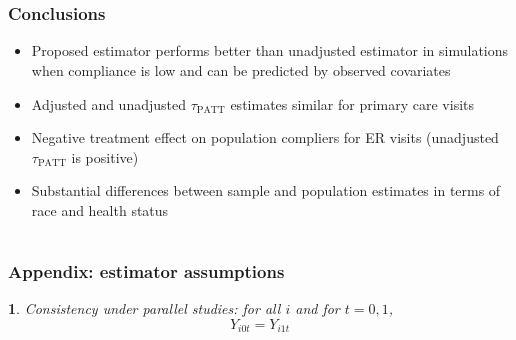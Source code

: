 \documentclass{beamer}
\makeatletter
\newtheorem*{assumption*}{\assumptionnumber}
\providecommand{\assumptionnumber}{}
\newenvironment{assumption}[2]
 {%
  \renewcommand{\assumptionnumber}{Assumption #1}%
  \begin{assumption*}%
  \protected@edef\@currentlabel{#1}%
 }
 {%
  \end{assumption*}
 }
\makeatother
\begin{document}
\section[Conclusions]{}

\begin{frame}
\frametitle{Conclusions}
\begin{itemize}
\item Proposed estimator performs better than unadjusted estimator in simulations when compliance is low and can be predicted by observed covariates
\item Adjusted and unadjusted $\tau_{\text{PATT}}$ estimates similar for primary care visits
\item Negative treatment effect on population compliers for ER visits (unadjusted $\tau_{\text{PATT}}$ is positive)
\item Substantial differences between sample and population estimates in terms of race and health status
\end{itemize}
\end{frame}

\section[References]{}

\begin{frame}
\begin{singlespace}
\begin{tiny}


\end{tiny}
\end{singlespace}
\itemize
\end{frame}

\begin{frame}
\frametitle{Appendix: estimator assumptions}
\begin{assumption}{1}{}\label{consistency}
Consistency under parallel studies: for all $i$ and for $t=0, 1$,
$$Y_{i0t} = Y_{i1t}$$
\end{assumption}
\end{frame}
\end{document}
